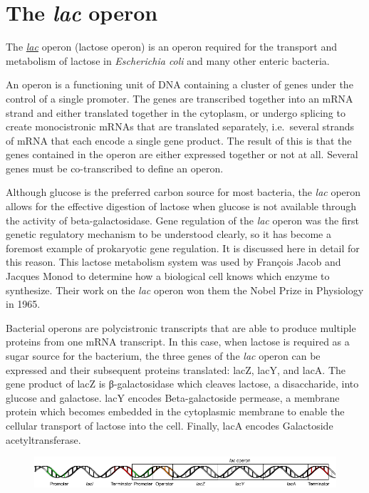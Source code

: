 \hypertarget{the-lac-operon}{%
\section{\texorpdfstring{The \emph{lac} operon}{The lac operon}}\label{the-lac-operon}}

The \href{https://en.wikipedia.org/wiki/Lac_operon}{\emph{lac}} operon (lactose operon) is an operon required for the transport and metabolism of lactose in \emph{Escherichia coli} and many other enteric bacteria.

An operon is a functioning unit of DNA containing a cluster of genes under the control of a single promoter. The genes are transcribed together into an mRNA strand and either translated together in the cytoplasm, or undergo splicing to create monocistronic mRNAs that are translated separately, i.e.~several strands of mRNA that each encode a single gene product. The result of this is that the genes contained in the operon are either expressed together or not at all. Several genes must be co-transcribed to define an operon.

Although glucose is the preferred carbon source for most bacteria, the \emph{lac} operon allows for the effective digestion of lactose when glucose is not available through the activity of beta-galactosidase. Gene regulation of the \emph{lac} operon was the first genetic regulatory mechanism to be understood clearly, so it has become a foremost example of prokaryotic gene regulation. It is discussed here in detail for this reason. This lactose metabolism system was used by François Jacob and Jacques Monod to determine how a biological cell knows which enzyme to synthesize. Their work on the \emph{lac} operon won them the Nobel Prize in Physiology in 1965.

Bacterial operons are polycistronic transcripts that are able to produce multiple proteins from one mRNA transcript. In this case, when lactose is required as a sugar source for the bacterium, the three genes of the \emph{lac} operon can be expressed and their subsequent proteins translated: lacZ, lacY, and lacA. The gene product of lacZ is β-galactosidase which cleaves lactose, a disaccharide, into glucose and galactose. lacY encodes Beta-galactoside permease, a membrane protein which becomes embedded in the cytoplasmic membrane to enable the cellular transport of lactose into the cell. Finally, lacA encodes Galactoside acetyltransferase.



\begin{figure}

{\centering \includegraphics[width=0.7\linewidth]{./figures/regulation/Lac_operon1} 

}

\caption{\href{https://commons.wikimedia.org/wiki/File:Lac_operon1.png}{}}\label{fig:lacoper}
\end{figure}

